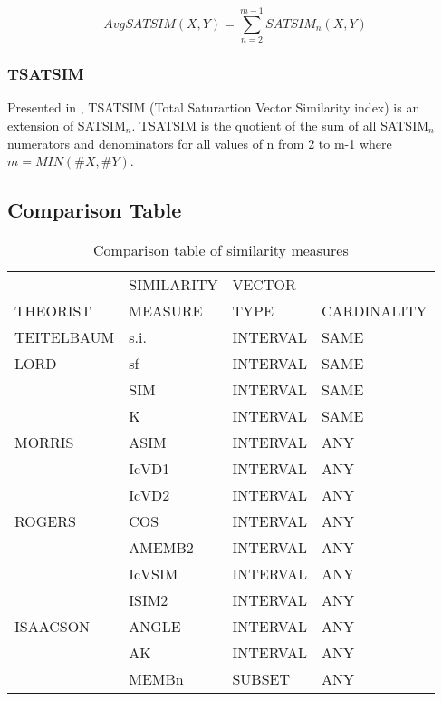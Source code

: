\documentclass{article}
\begin{document}
$$ AvgSATSIM(X,Y)=
\sum_{n=2}^{m-1}{SATSIM_{n}(X,Y)} $$
\subsubsection{TSATSIM}
\label{sec-11-9-5}

Presented in \citet[chap. 2.10]{Buchler1997}, TSATSIM (Total
Saturartion Vector Similarity index) is an extension of
SATSIM$_{n}$. TSATSIM is the quotient of the sum of all SATSIM$_{n}$
numerators and denominators for all values of n from 2 to m-1 where
$m=MIN(\#X,\#Y)$.
\subsection{Comparison Table}
\label{sec-11-10}

\begin{table}[htb]
\caption{Comparison table of similarity measures} 
\begin{center}
\begin{tabular}{llll}
\hline
             &  SIMILARITY  &  VECTOR    &               \\
 THEORIST    &  MEASURE     &  TYPE      &  CARDINALITY  \\
\hline
 TEITELBAUM  &  s.i.        &  INTERVAL  &  SAME         \\
\hline
 LORD        &  sf          &  INTERVAL  &  SAME         \\
\hline
             &  SIM         &  INTERVAL  &  SAME         \\
             &  K           &  INTERVAL  &  SAME         \\
 MORRIS      &  ASIM        &  INTERVAL  &  ANY          \\
\hline
             &  IcVD1       &  INTERVAL  &  ANY          \\
             &  IcVD2       &  INTERVAL  &  ANY          \\
 ROGERS      &  COS         &  INTERVAL  &  ANY          \\
\hline
             &  AMEMB2      &  INTERVAL  &  ANY          \\
             &  IcVSIM      &  INTERVAL  &  ANY          \\
             &  ISIM2       &  INTERVAL  &  ANY          \\
 ISAACSON    &  ANGLE       &  INTERVAL  &  ANY          \\
\hline
             &  AK          &  INTERVAL  &  ANY          \\
             &  MEMBn       &  SUBSET    &  ANY          \\

\end{tabular}
\end{center}
\end{table}
\end{document}
